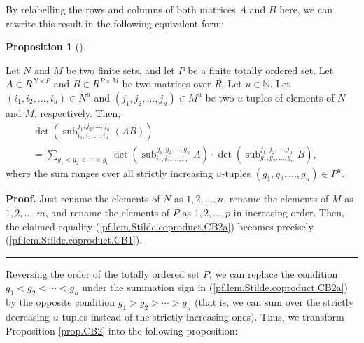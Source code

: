 \documentclass[numbers=enddot,12pt,final,onecolumn,notitlepage]{scrartcl}%
\numberwithin{exer}{section}
\theoremstyle{definition}
\newtheorem{prop}[theo]{Proposition}
\newenvironment{proposition}[1][]
{\begin{prop}[#1]\begin{leftbar}}
{\end{leftbar}\end{prop}}
\newenvironment{proof}[1][Proof]{\noindent\textbf{#1.} }{\ \rule{0.5em}{0.5em}}
\let\sumnonlimits\sum
\renewcommand{\sum}{\sumnonlimits\limits}
\theoremstyle{plainsl}
\begin{document}
By relabelling the rows and columns of both matrices $A$ and $B$ here, we can
rewrite this result in the following equivalent form:

\begin{proposition}
\label{prop.CB2}Let $N$ and $M$ be two finite sets, and let $P$ be a finite
totally ordered set. Let $A\in R^{N\times P}$ and $B\in R^{P\times M}$ be two
matrices over $R$. Let $u\in\mathbb{N}$. Let $\left(  i_{1},i_{2},\ldots
,i_{u}\right)  \in N^{u}$ and $\left(  j_{1},j_{2},\ldots,j_{u}\right)  \in
M^{u}$ be two $u$-tuples of elements of $N$ and $M$, respectively. Then,%
\begin{align}
&  \det\left(  \operatorname*{sub}\nolimits_{i_{1},i_{2},\ldots,i_{u}}%
^{j_{1},j_{2},\ldots,j_{u}}\left(  AB\right)  \right) \nonumber\\
&  =\sum_{g_{1}<g_{2}<\cdots<g_{u}}\det\left(  \operatorname*{sub}%
\nolimits_{i_{1},i_{2},\ldots,i_{u}}^{g_{1},g_{2},\ldots,g_{u}}A\right)
\cdot\det\left(  \operatorname*{sub}\nolimits_{g_{1},g_{2},\ldots,g_{u}%
}^{j_{1},j_{2},\ldots,j_{u}}B\right)
,\ \ \ \ \ \ \ \ \ \ \label{pf.lem.Stilde.coproduct.CB2a}%
\end{align}
where the sum ranges over all strictly increasing $u$-tuples $\left(
g_{1},g_{2},\ldots,g_{u}\right)  \in P^{u}$.
\end{proposition}

\begin{proof}
Just rename the elements of $N$ as $1,2,\ldots,n$, rename the elements of $M$
as $1,2,\ldots,m$, and rename the elements of $P$ as $1,2,\ldots,p$ in
increasing order. Then, the claimed equality
(\ref{pf.lem.Stilde.coproduct.CB2a}) becomes precisely
(\ref{pf.lem.Stilde.coproduct.CB1}).
\end{proof}

Reversing the order of the totally ordered set $P$, we can replace the
condition $g_{1}<g_{2}<\cdots<g_{u}$ under the summation sign in
(\ref{pf.lem.Stilde.coproduct.CB2a}) by the opposite condition $g_{1}%
>g_{2}>\cdots>g_{u}$ (that is, we can sum over the strictly decreasing
$u$-tuples instead of the strictly increasing ones). Thus, we transform
Proposition \ref{prop.CB2} into the following proposition:
\end{document}
